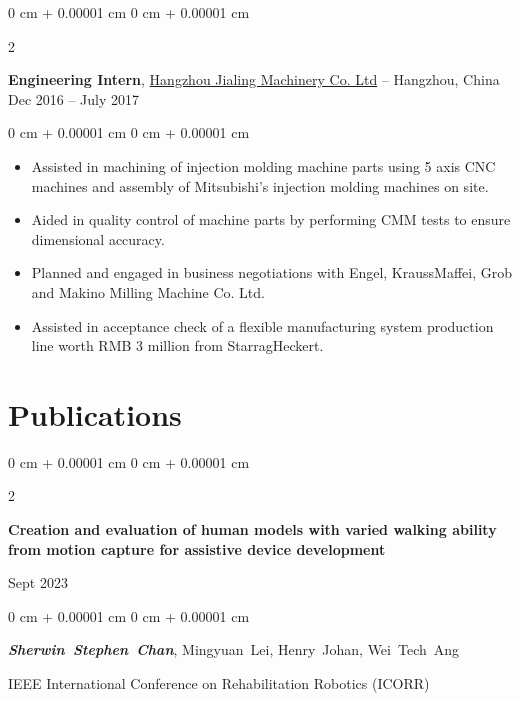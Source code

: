 \documentclass[10pt, letterpaper]{article}
\newenvironment{highlights}{
    \begin{itemize}[
        topsep=0.10 cm,
        parsep=0.10 cm,
        partopsep=0pt,
        itemsep=0pt,
        leftmargin=0 cm + 10pt
    ]
}{
    \end{itemize}
} %
\newenvironment{onecolentry}{
    \begin{adjustwidth}{
        0 cm + 0.00001 cm
    }{
        0 cm + 0.00001 cm
    }
}{
    \end{adjustwidth}
} %
\newenvironment{twocolentry}[2][]{
    \onecolentry
    \def\secondColumn{#2}
    \setcolumnwidth{\fill, 4.5 cm}
    \begin{paracol}{2}
}{
    \switchcolumn \raggedleft \secondColumn
    \end{paracol}
    \endonecolentry
} %
\begin{document}
        \vspace{0.2 cm}

        \begin{twocolentry}{
            Dec 2016 – July 2017
        }
            \textbf{Engineering Intern}, \href{http://www.kanon-machine.com/en/index.asp}{Hangzhou Jialing Machinery Co. Ltd} -- Hangzhou, China\end{twocolentry}

        \vspace{0.10 cm}
        \begin{onecolentry}
            \begin{highlights}
                \item Assisted in machining of injection molding machine parts using 5 axis CNC machines and assembly of Mitsubishi’s injection molding machines on site.
                \item Aided in quality control of machine parts by performing CMM tests to ensure dimensional accuracy.
                \item Planned and engaged in business negotiations with Engel, KraussMaffei, Grob and Makino Milling Machine Co. Ltd.
                \item Assisted in acceptance check of a flexible manufacturing system production line worth RMB 3 million from StarragHeckert.
            \end{highlights}
        \end{onecolentry}



    
    \section{Publications}



        
        \begin{samepage}
            \begin{twocolentry}{
                Sept 2023
            }
                \textbf{Creation and evaluation of human models with varied walking ability from motion capture for assistive device development}
            \end{twocolentry}

            \vspace{0.10 cm}
            
            \begin{onecolentry}
                \mbox{\textbf{\textit{Sherwin Stephen Chan}}}, \mbox{Mingyuan Lei}, \mbox{Henry Johan}, \mbox{Wei Tech Ang}

                \vspace{0.10 cm}
                
        IEEE International Conference on Rehabilitation Robotics (ICORR)\end{onecolentry}
        \end{samepage}
\end{document}
